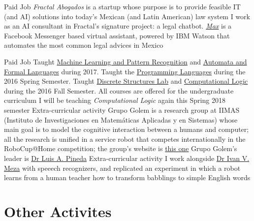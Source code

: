 \documentclass[10pt,a4paper,sans]{moderncv} %
\begin{document}
        {Paid Job}
        {\emph{Fractal Abogados} is a startup whose purpose is to provide feasible IT (and AI) solutions into today's Mexican (and Latin American) law system}
        {I work as an AI consultant in Fractal's signature project: a legal chatbot. \href{https://m.me/fractal-abogados}{\emph{Max}} is a Facebook Messenger based virtual assistant, powered by IBM Watson that automates the most common legal advices in Mexico}
        {}
        {}

        {Paid Job}
        {Taught \href{http://turing.iimas.unam.mx/~ivanvladimir/page/curso_rpyaa}{Machine Learning and Pattern Recognition} and \href{https://sites.google.com/site/automataslengformales20172/}{Automata and Formal Languages} during 2017. Taught the \href{https://sites.google.com/site/lengprog20162/}{Programming Languages} during the 2016 Spring Semester. Taught \href{https://sites.google.com/a/ciencias.unam.mx/estructuras-discretas/home}{Discrete Structures Lab} and \href{https://sites.google.com/site/logcompunam20171/home}{Computational Logic} during the 2016 Fall Semester. All courses are offered for the undergraduate curriculum}
        {I will be teaching \emph{Computational Logic} again this Spring 2018 semester}{}{}
        {Extra-curricular activity}
        {Grupo Golem is a research group at IIMAS (Instituto de Investigaciones en Matem\'{a}ticas Aplicadas y en Sistemas) whose main goal is to model the cognitive interaction between a humans and computer; all the research is unified in a service robot that competes internationally in the RoboCup@Home competition; the group's website is \href{http://golem.iimas.unam.mx/home.php?lang=en&sec=home}{this one}}
        {Grupo Golem's leader is \href{http://turing.iimas.unam.mx/~luis/}{Dr Luis A. Pineda}}{}{}
        {Extra-curricular activity}
        {I work alongside \href{http://turing.iimas.unam.mx/~ivanvladimir/}{Dr Ivan V. Meza} with speeech recognizers, and replicated an experiment in which a robot learns from a human teacher how to transform babblings to simple English words}
        {}{}{}


\section{Other Activites}
\end{document}
